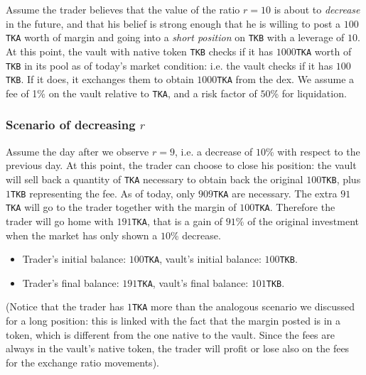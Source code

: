 \documentclass[a4paper,10 pt]{article}
\theoremstyle{definition}
\begin{document}
Assume the trader believes that the value of the ratio $r = 10$ is about to \emph{decrease} in the future, and that his belief is strong enough that he is willing to post a $100$\verb|TKA| worth of margin and going into a \emph{short position} on \verb|TKB| with a leverage of $10$. At this point, the vault with native token \verb|TKB| checks if it has $1000$\verb|TKA| worth of \verb|TKB| in its pool as of today's market condition: i.e. the vault checks if it has $100$\verb|TKB|. If it does, it exchanges them to obtain $1000$\verb|TKA| from the dex. We assume a fee of 1\% on the vault relative to \verb|TKA|, and a risk factor of $50$\% for liquidation.

\subsubsection{Scenario of decreasing $r$}
Assume the day after we observe $r = 9$, i.e. a decrease of $10$\% with respect to the previous day. At this point, the trader can choose to close his position: the vault will sell back a quantity of \verb|TKA| necessary to obtain back the original $100$\verb|TKB|, plus $1$\verb|TKB| representing the fee. As of today, only $909$\verb|TKA| are necessary. The extra $91$\verb|TKA| will go to the trader together with the margin of $100$\verb|TKA|. Therefore the trader will go home with $191$\verb|TKA|, that is a gain of $91$\% of the original investment when the market has only shown a $10$\% decrease. 
\begin{itemize}
    \item Trader's initial balance: $100$\verb|TKA|, vault's initial balance: $100$\verb|TKB|.
    \item Trader's final balance: $191$\verb|TKA|, vault's final balance: $101$\verb|TKB|.
\end{itemize}
(Notice that the trader has $1$\verb|TKA| more than the analogous scenario we discussed for a long position: this is linked with the fact that the margin posted is in a token, which is different from the one native to the vault. Since the fees are always in the vault's native token, the trader will profit or lose also on the fees for the exchange ratio movements).
\end{document}
